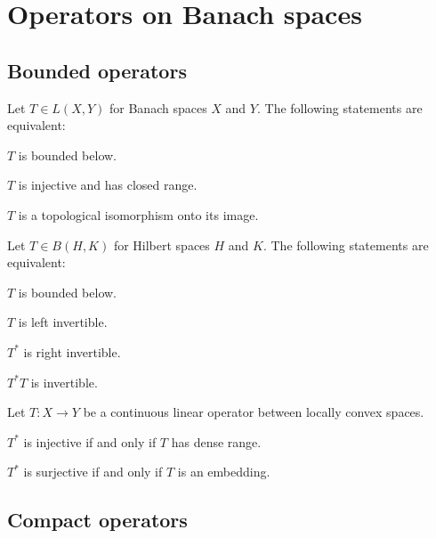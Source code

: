 \documentclass{../../large}
\begin{document}
\chapter{Operators on Banach spaces}

\section{Bounded operators}





\begin{prb}
Let $T\in L(X,Y)$ for Banach spaces $X$ and $Y$.
The following statements are equivalent:
\begin{parts}
\item $T$ is bounded below.
\item $T$ is injective and has closed range.
\item $T$ is a topological isomorphism onto its image.
\end{parts}
\end{prb}

\begin{prb}
Let $T\in B(H,K)$ for Hilbert spaces $H$ and $K$.
The following statements are equivalent:
\begin{parts}
\item $T$ is bounded below.
\item $T$ is left invertible.
\item $T^*$ is right invertible.
\item $T^*T$ is invertible.
\end{parts}
\end{prb}

\begin{prb}
Let $T:X\to Y$ be a continuous linear operator between locally convex spaces.
\begin{parts}
\item $T^*$ is injective if and only if $T$ has dense range.
\item $T^*$ is surjective if and only if $T$ is an embedding.
\end{parts}
\end{prb}








\section{Compact operators}
\end{document}
